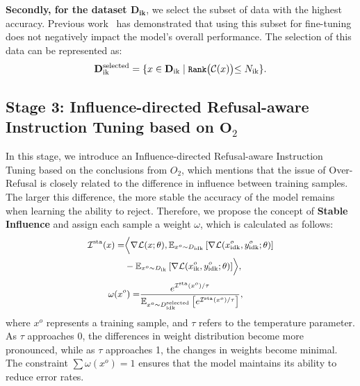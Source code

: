 \textbf{Secondly, for the dataset $\mathbf{D_{\text{ik}}}$}, we select the subset of data with the highest accuracy. Previous work~\cite{ren2024learning_or_align} has demonstrated that using this subset for fine-tuning does not negatively impact the model's overall performance. The selection of this data can be represented as:
\begin{equation}
\small
\label{eq:selected}
\mathbf{D_{\text{ik}}^{\text{selected}}} = \{ x \in \mathbf{D_{\text{ik}}} \mid \texttt{Rank}\bigl( \mathcal{C}(x) \bigl) \leq N_{\text{ik}} \}.
\end{equation}

\subsection{Stage 3: Influence-directed Refusal-aware Instruction Tuning based on $\mathbf{O}_2$}
In this stage, we introduce an Influence-directed Refusal-aware Instruction Tuning based on the conclusions from $O_{2}$, which mentions that the issue of Over-Refusal is closely related to the difference in influence between training samples. The larger this difference, the more stable the accuracy of the model remains when learning the ability to reject. Therefore, we propose the concept of \textbf{Stable Influence} and assign each sample a weight \(\omega\), which is calculated as follows:
\begin{equation}
\small
\label{eq:loss_decomposition}
\begin{aligned}
\mathcal{I}^{\text{sta}}(x) = & \Bigl \langle \nabla \mathcal{L}(x; \theta), 
  \mathbb{E}_{x^{o} \sim D_{\text{idk}}} \left[ \nabla \mathcal{L}(x^{o}_{\text{idk}}, y^{o}_{\text{idk}}; \theta) \right] \\
  & - \mathbb{E}_{x^{o} \sim D_{\text{ik}}} \left[ \nabla \mathcal{L}(x^{o}_{\text{ik}}, y^{o}_{\text{idk}}; \theta) \right] 
  \Bigr \rangle,
\end{aligned}
\end{equation}
\vspace{-0.3cm}
\begin{equation}
\small
\label{eq:loss_decomposition}
\begin{aligned} 
  \omega(x^{o}) = & \frac{e^{\mathcal{I}^{\text{sta}}(x^{o}) / \tau}}{\mathbb{E}_{x^{o} \sim D^{\text{selected}}_{\text{idk}}} \left[ e^{\mathcal{I}^{\text{sta}}(x^{o}) / \tau} \right]}, 
\end{aligned}
\end{equation}
where \(x^{o}\) represents a training sample, and \(\tau\) refers to the temperature parameter. As \(\tau\) approaches 0, the differences in weight distribution become more pronounced, while as \(\tau\) approaches 1, the changes in weights become minimal. The constraint \(\sum \omega(x^o) = 1\) ensures that the model maintains its ability to reduce error rates.

